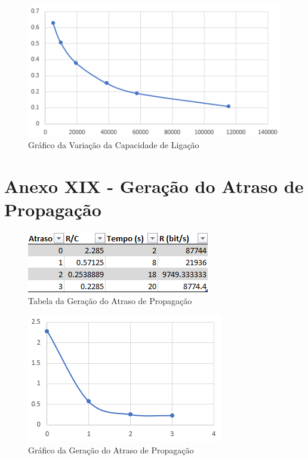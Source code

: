 \documentclass[article, a4paper, 11pt, oneside]{memoir}
\begin{document}
\begin{figure}[htbp]
  \centering        
  \includegraphics[scale=1]{img/baudrate.png}
  \caption{Gráfico da Variação da Capacidade de Ligação}
\end{figure}

\newpage

\section{Anexo XIX - Geração do Atraso de Propagação}

\begin{figure}[htbp]
  \centering        
  \includegraphics[scale=1]{img/atraso_table.png}
  \caption{Tabela da Geração do Atraso de Propagação}
\end{figure}

\begin{figure}[htbp]
  \centering        
  \includegraphics[scale=1]{img/atraso.png}
  \caption{Gráfico da Geração do Atraso de Propagação}
\end{figure}
\end{document}
